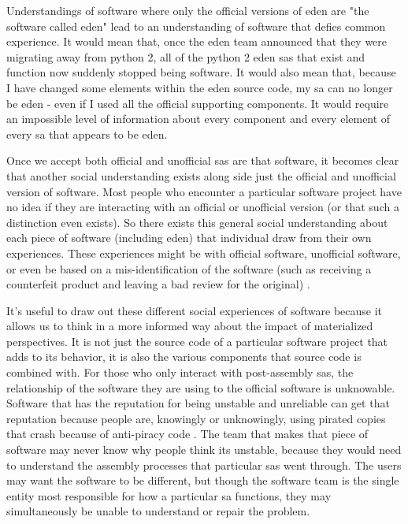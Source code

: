 \documentclass[a4paper,man,natbib]{apa6}
\begin{document}
   Understandings of software where only the official versions of \acrshort{eden} are "the software called \acrshort{eden}" lead to an understanding of software that defies common experience. It would mean that, once the \acrshort{eden} team announced that they were migrating away from \gls{python} 2, all of the \gls{python} 2 \acrshort{eden} \glspl{sa} that exist and function now suddenly stopped being software. It would also mean that, because I have changed some elements within the \acrshort{eden} source code, my \gls{sa} can no longer be \acrshort{eden} - even if I used all the official supporting components. It would require an impossible level of information about every component and every element of every \gls{sa} that appears to be \acrshort{eden}.

   Once we accept both official and unofficial \glspl{sa} are that software, it becomes clear that another social understanding exists along side just the official and unofficial version of software. Most people who encounter a particular software project have no idea if they are interacting with an official or unofficial version (or that such a distinction even exists). So there exists this general social understanding about each piece of software (including \acrshort{eden}) that individual draw from their own experiences. These experiences might be with official software, unofficial software, or even be based on a mis-identification of the software (such as receiving a counterfeit product and leaving a bad review for the original) \citep{Suthivarakom2020-cp}.

   It's useful to draw out these different social experiences of software because it allows us to think in a more informed way about the impact of materialized perspectives. It is not just the source code of a particular software project that adds to its behavior, it is also the various components that source code is combined with. For those who only interact with post-assembly \glspl{sa}, the relationship of the software they are using to the official software is unknowable. Software that has the reputation for being unstable and unreliable can get that reputation because people are, knowingly or unknowingly, using pirated copies that crash because of anti-piracy code \citep{Fitch2008-vq}. The team that makes that piece of software may never know why people think its unstable, because they would need to understand the assembly processes that particular \glspl{sa} went through. The users may want the software to be different, but though the software team is the single entity most responsible for how a particular \gls{sa} functions, they may simultaneously be unable to understand or repair the problem.


   

   
  
   \printnoidxglossaries
   \setlength{\parindent}{4em}
   
\end{document}
